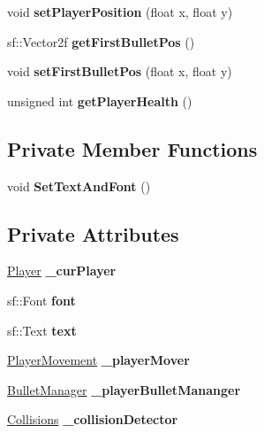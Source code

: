 \begin{DoxyCompactItemize}
void {\bfseries set\+Player\+Position} (float x, float y)
\item 
\mbox{\label{class_player_manager_a1e058a4c38ae4b17a8541feb40247d06}} 
sf\+::\+Vector2f {\bfseries get\+First\+Bullet\+Pos} ()
\item 
\mbox{\label{class_player_manager_ae654ee04f5d9820cbb4c6b91161cc7a2}} 
void {\bfseries set\+First\+Bullet\+Pos} (float x, float y)
\item 
\mbox{\label{class_player_manager_a1e1d29acf1a54f18fafe6a2a91c67ee7}} 
unsigned int {\bfseries get\+Player\+Health} ()
\end{DoxyCompactItemize}
\subsection*{Private Member Functions}
\begin{DoxyCompactItemize}
\item 
\mbox{\label{class_player_manager_a7f6871a42521409f64c1a335a48c4398}} 
void {\bfseries Set\+Text\+And\+Font} ()
\end{DoxyCompactItemize}
\subsection*{Private Attributes}
\begin{DoxyCompactItemize}
\item 
\mbox{\label{class_player_manager_a60256e044fc83080d90cd57d24ba0e29}} 
\hyperlink{class_player}{Player} {\bfseries \+\_\+cur\+Player}
\item 
\mbox{\label{class_player_manager_a01378a061dd9a9170c6f45cd1955dec1}} 
sf\+::\+Font {\bfseries font}
\item 
\mbox{\label{class_player_manager_a2fc335171a9117a91aa672cf4ce78e1a}} 
sf\+::\+Text {\bfseries text}
\item 
\mbox{\label{class_player_manager_a1c29120eaa2bd04b1a9f270cbd8ac749}} 
\hyperlink{class_player_movement}{Player\+Movement} {\bfseries \+\_\+player\+Mover}
\item 
\mbox{\label{class_player_manager_a8e97405a3e13fc9c7dbba27e09ffd66d}} 
\hyperlink{class_bullet_manager}{Bullet\+Manager} {\bfseries \+\_\+player\+Bullet\+Mananger}
\item 
\mbox{\label{class_player_manager_ae736dee4829cc21604a6d800b7a2222e}} 
\hyperlink{class_collisions}{Collisions} {\bfseries \+\_\+collision\+Detector}
\end{DoxyCompactItemize}


